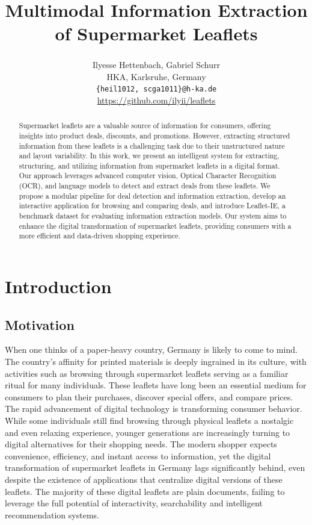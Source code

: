 \documentclass[11pt]{article}
\title{Multimodal Information Extraction of Supermarket Leaflets}
\author{Ilyesse Hettenbach\textsuperscript{}, Gabriel Schurr\textsuperscript{} \\
HKA, Karlsruhe, Germany \\
\texttt{\{heil1012, scga1011\}@h-ka.de} \\
\href{https://github.com/ilyii/leaflets}{https://github.com/ilyii/leaflets}
}
\begin{document}
\maketitle
\begin{abstract}
Supermarket leaflets are a valuable source of information for consumers, offering insights into product deals, discounts, and promotions. However, extracting structured information from these leaflets is a challenging task due to their unstructured nature and layout variability. In this work, we present an intelligent system for extracting, structuring, and utilizing information from supermarket leaflets in a digital format. Our approach leverages advanced computer vision, Optical Character Recognition (OCR), and language models to detect and extract deals from these leaflets. We propose a modular pipeline for deal detection and information extraction, develop an interactive application for browsing and comparing deals, and introduce Leaflet-IE, a benchmark dataset for evaluating information extraction models. Our system aims to enhance the digital transformation of supermarket leaflets, providing consumers with a more efficient and data-driven shopping experience.
\end{abstract}

\section{Introduction}

\subsection{Motivation}
When one thinks of a paper-heavy country, Germany is likely to come to mind. The country's affinity for printed materials is deeply ingrained in its culture, with activities such as browsing through supermarket leaflets serving as a familiar ritual for many individuals. These leaflets have long been an essential medium for consumers to plan their purchases, discover special offers, and compare prices.
The rapid advancement of digital technology is transforming consumer behavior. While some individuals still find browsing through physical leaflets a nostalgic and even relaxing experience, younger generations are increasingly turning to digital alternatives for their shopping needs. The modern shopper expects convenience, efficiency, and instant access to information, yet the digital transformation of supermarket leaflets in Germany lags significantly behind, even despite the existence of applications that centralize digital versions of these leaflets. The majority of these digital leaflets are plain documents, failing to leverage the full potential of interactivity, searchability and intelligent recommendation systems. 
\end{document}
